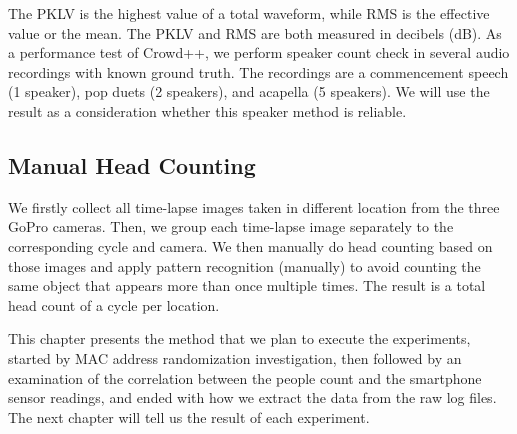 The \ac{PKLV} is the highest value of a total waveform, while \ac{RMS} is the effective value or the mean. The \ac{PKLV} and \ac{RMS} are both measured in decibels (dB). As a performance test of Crowd++, we perform speaker count check in several audio recordings with known ground truth. The recordings are a commencement speech (1 speaker), pop duets (2 speakers), and acapella (5 speakers). We will use the result as a consideration whether this speaker method is reliable.


\subsection{Manual Head Counting} %
\label{sub:manual_head_counting}
We firstly collect all time-lapse images taken in different location from the three GoPro cameras. Then, we group each time-lapse image separately to the corresponding cycle and camera. We then manually do head counting based on those images and apply pattern recognition (manually) to avoid counting the same object that appears more than once multiple times. The result is a total head count of a cycle per location.
	







This chapter presents the method that we plan to execute the experiments, started by \ac{MAC} address randomization investigation, then followed by an examination of the correlation between the people count and the smartphone sensor readings, and ended with how we extract the data from the raw log files. The next chapter will tell us the result of each experiment.


